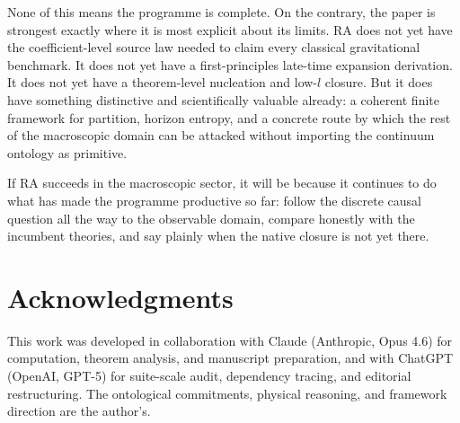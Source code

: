 \documentclass[11pt]{article}
\def\ell{l}%
\begin{document}
None of this means the programme is complete. On the contrary, the paper is strongest exactly where it is most explicit about its limits. RA does not yet have the coefficient-level source law needed to claim every classical gravitational benchmark. It does not yet have a first-principles late-time expansion derivation. It does not yet have a theorem-level nucleation and low-$\ell$ closure. But it does have something distinctive and scientifically valuable already: a coherent finite framework for partition, horizon entropy, and a concrete route by which the rest of the macroscopic domain can be attacked without importing the continuum ontology as primitive.

If RA succeeds in the macroscopic sector, it will be because it continues to do what has made the programme productive so far: follow the discrete causal question all the way to the observable domain, compare honestly with the incumbent theories, and say plainly when the native closure is not yet there.

\section*{Acknowledgments}

This work was developed in collaboration with Claude (Anthropic, Opus 4.6) for computation, theorem analysis, and manuscript preparation, and with ChatGPT (OpenAI, GPT-5) for suite-scale audit, dependency tracing, and editorial restructuring. The ontological commitments, physical reasoning, and framework direction are the author's.
\end{document}
